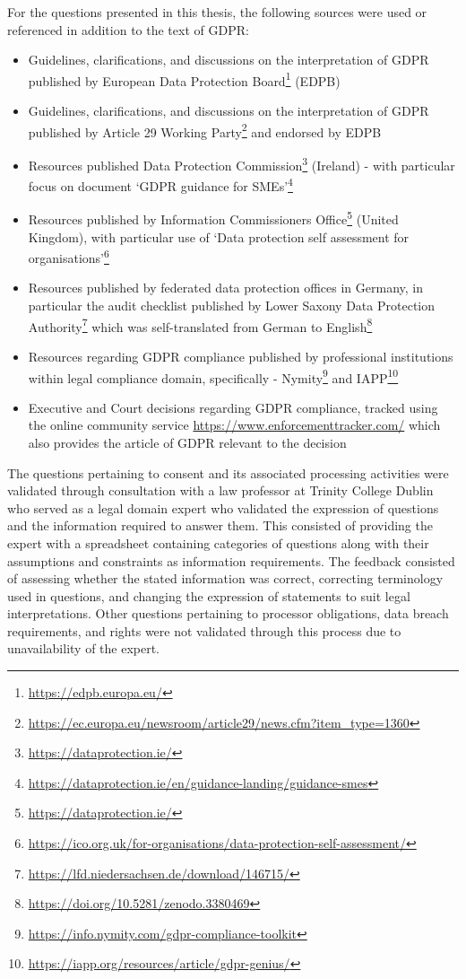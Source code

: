 For the questions presented in this thesis, the following sources were used or referenced in addition to the text of GDPR:
\begin{itemize}
    \item Guidelines, clarifications, and discussions on the interpretation of GDPR published by European Data Protection Board\footnote{\url{https://edpb.europa.eu/}} (EDPB)
    \item Guidelines, clarifications, and discussions on the interpretation of GDPR published by Article 29 Working Party\footnote{\url{https://ec.europa.eu/newsroom/article29/news.cfm?item_type=1360}} and endorsed by EDPB
    \item Resources published Data Protection Commission\footnote{\url{https://dataprotection.ie/}} (Ireland) - with particular focus on document `GDPR guidance for SMEs'\footnote{\url{https://dataprotection.ie/en/guidance-landing/guidance-smes}}
    \item Resources published by Information Commissioners Office\footnote{\url{https://dataprotection.ie/}} (United Kingdom), with particular use of `Data protection self assessment for organisations'\footnote{\url{https://ico.org.uk/for-organisations/data-protection-self-assessment/}}
    \item Resources published by federated data protection offices in Germany, in particular the audit checklist published by Lower Saxony Data Protection Authority\footnote{\url{https://lfd.niedersachsen.de/download/146715/}} which was self-translated from German to English\footnote{\url{https://doi.org/10.5281/zenodo.3380469}}
    \item Resources regarding GDPR compliance published by professional institutions within legal compliance domain, specifically - Nymity\footnote{\url{https://info.nymity.com/gdpr-compliance-toolkit}} and IAPP\footnote{\url{https://iapp.org/resources/article/gdpr-genius/}}
    \item Executive and Court decisions regarding GDPR compliance, tracked using the online community service \url{https://www.enforcementtracker.com/} which also provides the article of GDPR relevant to the decision
\end{itemize}

The questions pertaining to consent and its associated processing activities were validated through consultation with a law professor at Trinity College Dublin who served as a legal domain expert who validated the expression of questions and the information required to answer them. This consisted of providing the expert with a spreadsheet containing categories of questions along with their assumptions and constraints as information requirements. The feedback consisted of assessing whether the stated information was correct, correcting terminology used in questions, and changing the expression of statements to suit legal interpretations.
Other questions pertaining to processor obligations, data breach requirements, and rights were not validated through this process due to unavailability of the expert.

